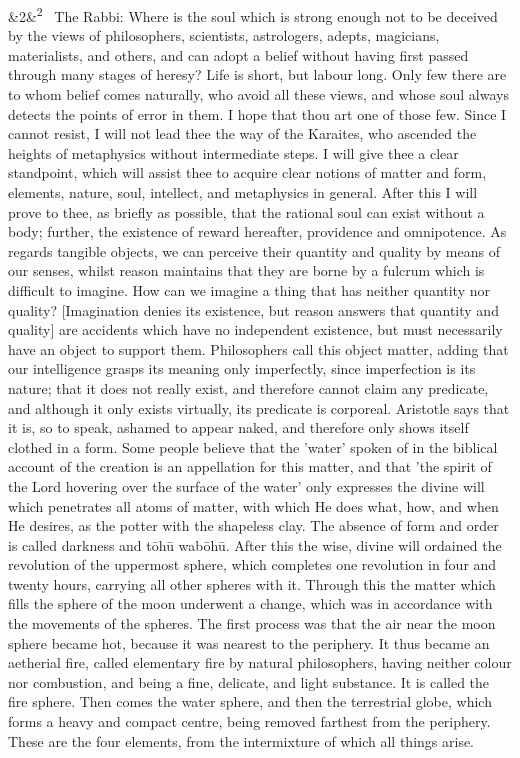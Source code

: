 \documentclass[12pt]{article}
\newcommand{\para}[1][]{\par\noindent\ifx&#1&\else\textsuperscript{\footnotesize #1}~\fi}
\begin{document}
\para[2] The Rabbi: Where is the soul which is strong enough not to be deceived by the views of philosophers, scientists, astrologers, adepts, magicians, materialists, and others, and can adopt a belief without having first passed through many stages of heresy? Life is short, but labour long. Only few there are to whom belief comes naturally, who avoid all these views, and whose soul always detects the points of error in them. I hope that thou art one of those few. Since I cannot resist, I will not lead thee the way of the Karaites, who ascended the heights of metaphysics without intermediate steps. I will give thee a clear standpoint, which will assist thee to acquire clear notions of matter and form, elements, nature, soul, intellect, and metaphysics in general. After this I will prove to thee, as briefly as possible, that the rational soul can exist without a body; further, the existence of reward hereafter, providence and omnipotence. As regards tangible objects, we can perceive their quantity and quality by means of our senses, whilst reason maintains that they are borne by a fulcrum which is difficult to imagine. How can we imagine a thing that has neither quantity nor quality? [Imagination denies its existence, but reason answers that quantity and quality] are accidents which have no independent existence, but must necessarily have an object to support them. Philosophers call this object matter, adding that our intelligence grasps its meaning only imperfectly, since imperfection is its nature; that it does not really exist, and therefore cannot claim any predicate, and although it only exists virtually, its predicate is corporeal. Aristotle says that it is, so to speak, ashamed to appear naked, and therefore only shows itself clothed in a form. Some people believe that the 'water' spoken of in the biblical account of the creation is an appellation for this matter, and that 'the spirit of the Lord hovering over the surface of the water' only expresses the divine will which penetrates all atoms of matter, with which He does what, how, and when He desires, as the potter with the shapeless clay. The absence of form and order is called darkness and tōhū wabōhū. After this the wise, divine will ordained the revolution of the uppermost sphere, which completes one revolution in four and twenty hours, carrying all other spheres with it. Through this the matter which fills the sphere of the moon underwent a change, which was in accordance with the movements of the spheres. The first process was that the air near the moon sphere became hot, because it was nearest to the periphery. It thus became an aetherial fire, called elementary fire by natural philosophers, having neither colour nor combustion, and being a fine, delicate, and light substance. It is called the fire sphere. Then comes the water sphere, and then the terrestrial globe, which forms a heavy and compact centre, being removed farthest from the periphery. These are the four elements, from the intermixture of which all things arise.
\end{document}
